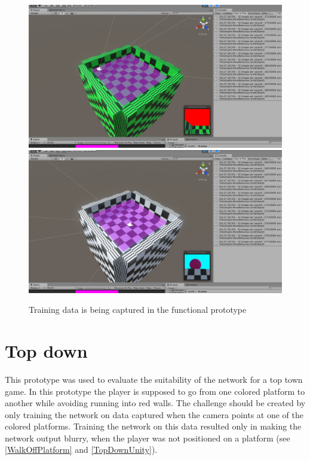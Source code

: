 \begin{figure}[p]
  \centering
  \includegraphics[width=\imgWidth]{images/workflow/Functional1.png} \\[\picVdist]
  \includegraphics[width=\imgWidth]{images/workflow/Functional2.png}
  \caption{Training data is being captured in the functional prototype}
  \label{FunctionalCapture}
\end{figure}

\section{Top down}
This prototype was used to evaluate the suitability of the network for a top town game. In this prototype the player is supposed to go from one colored platform to another while avoiding running into red walls. The challenge should be created by only training the network on data captured when the camera points at one of the colored platforms. Training the network on this data resulted only in making the network output blurry, when the player was not positioned on a platform (see \cref{WalkOffPlatform} and \cref{TopDownUnity}).


